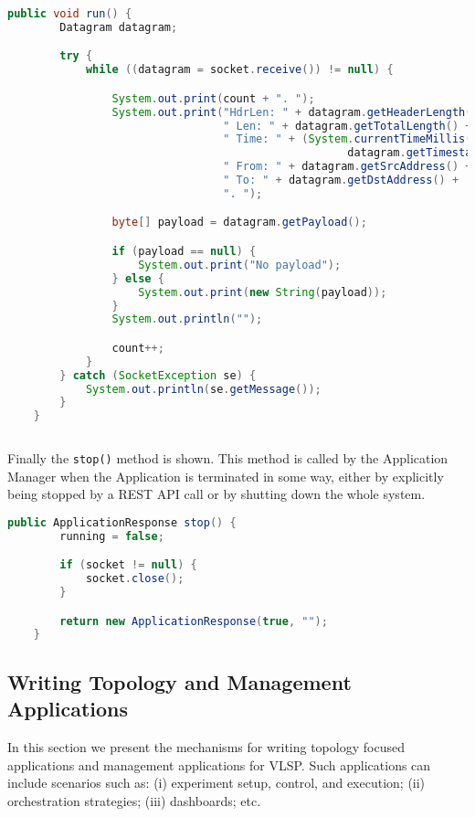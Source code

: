 \begin{lstlisting}[language=java,frame=single]
    public void run() {
        Datagram datagram;

        try {
            while ((datagram = socket.receive()) != null) {

                System.out.print(count + ". ");
                System.out.print("HdrLen: " + datagram.getHeaderLength() +
                                 " Len: " + datagram.getTotalLength() +
                                 " Time: " + (System.currentTimeMillis() - 
                                                    datagram.getTimestamp()) +
                                 " From: " + datagram.getSrcAddress() +
                                 " To: " + datagram.getDstAddress() +
                                 ". ");

                byte[] payload = datagram.getPayload();

                if (payload == null) {
                    System.out.print("No payload");
                } else {
                    System.out.print(new String(payload));
                }
                System.out.println("");

                count++;
            }
        } catch (SocketException se) {
            System.out.println(se.getMessage());
        }
    }
    
\end{lstlisting}

\noindent Finally the \texttt{stop()} method is shown.
This method is called by the Application Manager when the Application
is terminated in some way, either by explicitly being stopped by a
REST API call or by shutting down the whole system.

\begin{lstlisting}[language=java,frame=single]
    public ApplicationResponse stop() {
        running = false;

        if (socket != null) {
            socket.close();
        }

        return new ApplicationResponse(true, "");
    }
\end{lstlisting}

\subsection{Writing Topology and Management Applications}

In this section we present the mechanisms for writing topology focused
applications and management
applications for VLSP.  Such applications can include scenarios such
as: (i) experiment setup, control, and execution; (ii) orchestration
strategies; (iii) dashboards; etc.




